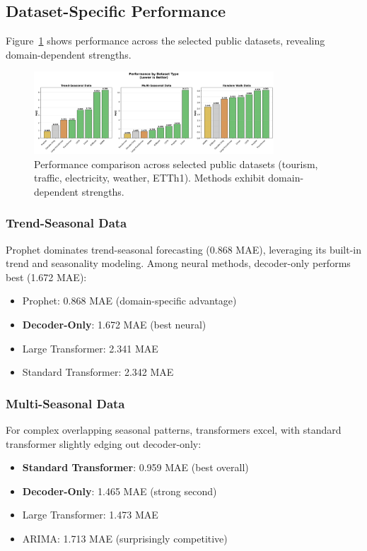\documentclass[11pt]{article}
\begin{document}
\subsection{Dataset-Specific Performance}

Figure~\ref{fig:dataset_performance} shows performance across the selected public datasets, revealing domain-dependent strengths.

\begin{figure}[h]
\centering
\includegraphics[width=0.8\textwidth]{results/figure3_dataset_performance.png}
\caption{Performance comparison across selected public datasets (tourism, traffic, electricity, weather, ETTh1). Methods exhibit domain-dependent strengths.}
\label{fig:dataset_performance}
\end{figure}

\subsubsection{Trend-Seasonal Data}

Prophet dominates trend-seasonal forecasting (0.868 MAE), leveraging its built-in trend and seasonality modeling. Among neural methods, decoder-only performs best (1.672 MAE):

\begin{itemize}
\item Prophet: 0.868 MAE (domain-specific advantage)
\item \textbf{Decoder-Only}: 1.672 MAE (best neural)
\item Large Transformer: 2.341 MAE
\item Standard Transformer: 2.342 MAE
\end{itemize}

\subsubsection{Multi-Seasonal Data}

For complex overlapping seasonal patterns, transformers excel, with standard transformer slightly edging out decoder-only:

\begin{itemize}
\item \textbf{Standard Transformer}: 0.959 MAE (best overall)
\item \textbf{Decoder-Only}: 1.465 MAE (strong second)
\item Large Transformer: 1.473 MAE
\item ARIMA: 1.713 MAE (surprisingly competitive)
\end{itemize}
\end{document}
